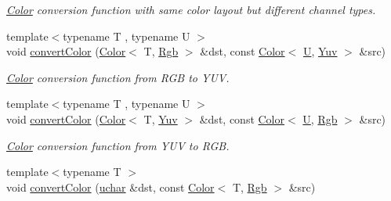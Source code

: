 \begin{DoxyCompactItemize}
\begin{DoxyCompactList}\small\item\em \hyperlink{class_d_o_1_1_color}{Color} conversion function with same color layout but different channel types. \end{DoxyCompactList}\item 
\hypertarget{group___color_conversion_ga940c39e5cdcff0e182ad7f1911e1fdbb}{{\footnotesize template$<$typename T , typename U $>$ }\\void \hyperlink{group___color_conversion_ga940c39e5cdcff0e182ad7f1911e1fdbb}{convert\-Color} (\hyperlink{class_d_o_1_1_color}{Color}$<$ T, \hyperlink{group___color_space_gaad92fea51e98e11252ac86f2c8665d13}{Rgb} $>$ \&dst, const \hyperlink{class_d_o_1_1_color}{Color}$<$ \hyperlink{struct_d_o_1_1_u}{U}, \hyperlink{group___color_space_ga8d04b5aa0ecd455aa29da0987b106ad0}{Yuv} $>$ \&src)}\label{group___color_conversion_ga940c39e5cdcff0e182ad7f1911e1fdbb}

\begin{DoxyCompactList}\small\item\em \hyperlink{class_d_o_1_1_color}{Color} conversion function from R\-G\-B to Y\-U\-V. \end{DoxyCompactList}\item 
\hypertarget{group___color_conversion_gaf208517efbfb2d905bdb2724145383e7}{{\footnotesize template$<$typename T , typename U $>$ }\\void \hyperlink{group___color_conversion_gaf208517efbfb2d905bdb2724145383e7}{convert\-Color} (\hyperlink{class_d_o_1_1_color}{Color}$<$ T, \hyperlink{group___color_space_ga8d04b5aa0ecd455aa29da0987b106ad0}{Yuv} $>$ \&dst, const \hyperlink{class_d_o_1_1_color}{Color}$<$ \hyperlink{struct_d_o_1_1_u}{U}, \hyperlink{group___color_space_gaad92fea51e98e11252ac86f2c8665d13}{Rgb} $>$ \&src)}\label{group___color_conversion_gaf208517efbfb2d905bdb2724145383e7}

\begin{DoxyCompactList}\small\item\em \hyperlink{class_d_o_1_1_color}{Color} conversion function from Y\-U\-V to R\-G\-B. \end{DoxyCompactList}\item 
\hypertarget{group___color_conversion_ga11ec76ce23b7ed0a5df4cc76bb2afc2a}{{\footnotesize template$<$typename T $>$ }\\void \hyperlink{group___color_conversion_ga11ec76ce23b7ed0a5df4cc76bb2afc2a}{convert\-Color} (\hyperlink{group___eigen_typedefs_ga65f85814a8290f9797005d3b28e7e5fc}{uchar} \&dst, const \hyperlink{class_d_o_1_1_color}{Color}$<$ T, \hyperlink{group___color_space_gaad92fea51e98e11252ac86f2c8665d13}{Rgb} $>$ \&src)}\label{group___color_conversion_ga11ec76ce23b7ed0a5df4cc76bb2afc2a}


\end{DoxyCompactItemize}
